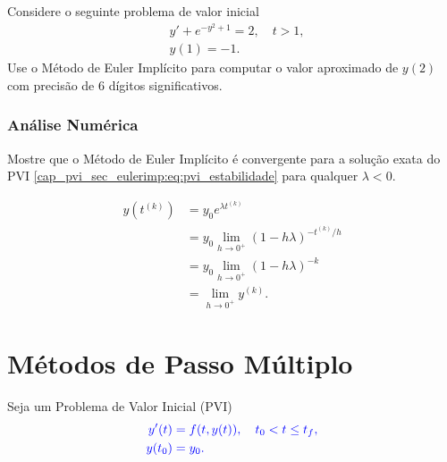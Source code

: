 \begin{exer}
  Considere o seguinte problema de valor inicial
  \begin{subequations}
    \begin{align}
      &y' + e^{-y^2+1} = 2,\quad t>1,\\
      &y(1) = -1.
    \end{align}
\end{subequations}
Use o Método de Euler Implícito para computar o valor aproximado de $y(2)$ com precisão de $6$ dígitos significativos.
\end{exer}


\subsubsection{Análise Numérica}

\begin{exer}\label{cap_pvi_sec_eulerimp:exer:exatidao}
  Mostre que o Método de Euler Implícito é convergente para a solução exata do PVI \eqref{cap_pvi_sec_eulerimp:eq:pvi_estabilidade}  para qualquer $\lambda <0$.
\end{exer}
\begin{resp}
  \begin{align}
    y\left(t^{(k)}\right) &= y_0e^{\lambda t^{(k)}}\\
                          &= y_0\lim_{h\to 0^+} \left(1 - h\lambda\right)^{-t^{(k)}/h}\\
                          &= y_0 \lim_{h\to 0^+} \left(1 - h\lambda\right)^{-k}\\
                          &= \lim_{h\to 0^+} y^{(k)}.
  \end{align}
\end{resp}



\section{Métodos de Passo Múltiplo}\label{cap_pvi_sec_passo_mult}

Seja um Problema de Valor Inicial (PVI)
\begin{subequations}\hleq
  \begin{align}
    y'(t) &= f(t,y(t)),\quad t_0 < t \leq t_f,\\
    y(t_0) &= y_0.
  \end{align}
\end{subequations}

